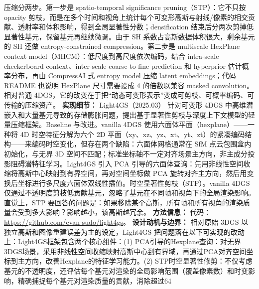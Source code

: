 压缩分两步。第一步是 spatio-temporal significance pruning（STP）：它不只按 opacity 剪枝，而是在多个时间和视角上统计每个可变形高斯与射线/像素的相交贡献、透射率和体积影响，得到全局显著性分数；densification 结束后分两次剪掉低显著性基元，保留基元再继续微调。由于 SH 系数占高斯数据体积很大，剩余基元的 SH 还做 entropy-constrained compression。第二步是 multiscale HexPlane context model（MHCM）：低尺度到高尺度依次编码，结合 intra-scale checkerboard context、inter-scale coarse-to-fine prediction 和 hyperprior 估计概率分布，再由 CompressAI 式 entropy model 压缩 latent embeddings；代码 README 也说明 HexPlane 尺寸需要设成 4 的倍数以兼容 masked convolution。相对普通 4DGS，它的改变在于把“动态可变形表示”变成可剪枝、可概率编码、可传输的压缩资产。
\textbf{实现细节：} Light4GS（2025.03） 针对可变形 4DGS 中高维潜嵌入和大量基元导致的存储膨胀问题，提出基于显著性剪枝与深度上下文模型的轻量压缩框架。Baseline 与改进。vanilla 4DGS 使用六面体平面（hexplane）——一种将 4D 时空特征分解为六个 2D 平面（xy、xz、yz、xt、yt、zt）的紧凑编码结构——来编码时空变化，但存在两个缺陷：六面体网格通常在 SfM 点云包围盒内初始化，与无界 3D 空间不匹配；标准坐标轴不一定对齐场景主方向，非主成分投影阻碍潜特征学习。Light4GS 引入 PCA 引导的六面体查询：先用非线性空间收缩将高斯中心映射到有界空间，再对空间坐标做 PCA 旋转对齐主方向，然后用变换后坐标进行多尺度六面体双线性插值。时空显著性剪枝（STP）。vanilla 4DGS 仅通过不透明度剪枝低贡献基元，忽略了基元在不同帧和视角下的全局渲染影响。直觉上，STP 要回答的问题是：如果移除某个高斯，所有帧和所有视角的渲染质量会受到多大影响？影响越小，该高斯越冗余。
\textbf{方法信息：} 代码：\url{https://github.com/evan-sudo/light4gs}。
\textbf{设计动机与边界：} 相对原始 3DGS 以独立高斯和图像重建误差为主的设定，Light4GS 把问题落在以下可实现的改动上：Light4GS框架包含两个核心组件：(1) PCA引导的Hexplane查询：对无界3DGS场景，采用非线性空间收缩映射高斯中心到有界域，再通过PCA对齐空间坐标到主方向，改善Hexplane的特征学习能力。(2) STP时空显著性修剪：不仅考虑基元的不透明度，还评估每个基元对渲染的全局影响范围（覆盖像素数）和时变影响，精确捕捉每个基元对渲染质量的贡献，消除超过64%
